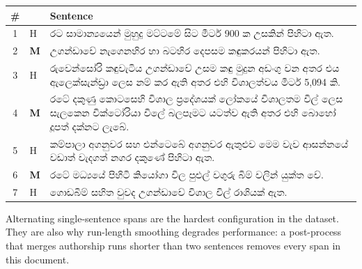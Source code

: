 \begin{table}[h]
\centering
\small
\begin{tabular}{@{}cl p{}@{}}
\toprule
\# & & Sentence \\
\midrule
1 & H & \si{රට සාමාන්‍යයෙන් මුහුදු මට්ටමේ සිට මීටර් 900 ක උසකින් පිහිටා ඇත.} \\[2pt]
2 & \textbf{M} & \si{උගන්ඩාවේ නැගෙනහිර හා බටහිර දෙපසම කඳුකරයන් පිහිටා ඇත.} \\[2pt]
3 & H & \si{රුවෙන්සෝරි කඳුවැටිය උගන්ඩාවේ උසම කඳු මුදුන අඩංගු වන අතර එය ඇලෙක්සැන්ඩ්‍රා ලෙස නම් කර ඇති අතර එහි විශාලත්වය මීටර් 5,094 කි.} \\[2pt]
4 & \textbf{M} & \si{රටේ දකුණු කොටසෙහි විශාල ප්‍රදේශයක් ලෝකයේ විශාලතම විල් ලෙස සැලකෙන වික්ටෝරියා විලේ බලපෑමට යටත්ව ඇති අතර එහි බොහෝ දූපත් දක්නට ලැබේ.} \\[2pt]
5 & H & \si{කම්පාලා අගනුවර සහ එන්ටෙබේ අගනුවර ඇතුළුව මෙම වැව ආසන්නයේ වඩාත් වැදගත් නගර දකුණේ පිහිටා ඇත.} \\[2pt]
6 & \textbf{M} & \si{රටේ මධ්‍යයේ පිහිටි කියෝගා විල පුළුල් වගුරු බිම් වලින් යුක්ත වේ.} \\[2pt]
7 & H & \si{ගොඩබිම් සහිත වුවද උගන්ඩාවේ විශාල විල් රාශියක් ඇත.} \\
\bottomrule
\end{tabular}
\end{table}

Alternating single-sentence spans are the hardest configuration in the dataset.
They are also why run-length smoothing degrades performance: a post-process
that merges authorship runs shorter than two sentences removes every span in
this document.
